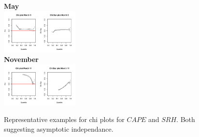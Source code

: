 \documentclass[10pt,conference,compsocconf]{IEEEtran}
\begin{document}
\begin{figure}
	\centering
	\textbf{May}\\
	\includegraphics[width=0.35\textwidth]{../plots/May_chi.pdf}\\
	\textbf{November}\\
	\includegraphics[width=0.35\textwidth]{../plots/November_chi.pdf}
	\caption{Representative examples for chi plots for $CAPE$ and $SRH$. Both suggesting asymptotic independance.}
	\label{fig:cape_srh_chi}
\end{figure}
\end{document}
